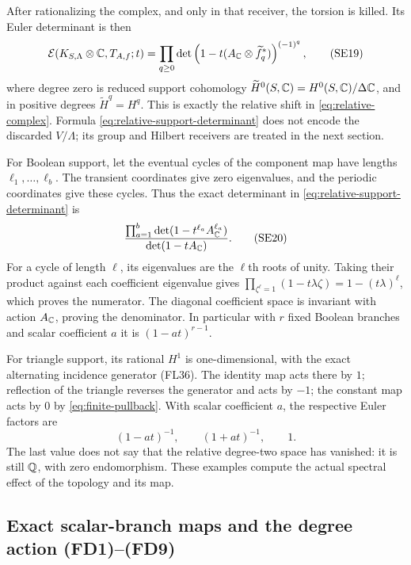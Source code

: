 After rationalizing the complex, and only in that receiver, the
torsion is killed. Its Euler determinant is then
\[
 \mathcal E(K_{S,\Lambda}\otimes\mathbb C,T_{A,f};t)
 =\prod_{q\ge0}
 \det\left(1-t(A_\mathbb C\otimes\widetilde f_q^*)\right)^{(-1)^q},
 \tag{SE19}\label{eq:relative-support-determinant}
\]
where degree zero is reduced support cohomology
$\widetilde H^0(S,\mathbb C)=H^0(S,\mathbb C)/\Delta\mathbb C$, and in positive degrees
$\widetilde H^q=H^q$. This is exactly the relative shift in
\eqref{eq:relative-complex}. Formula \eqref{eq:relative-support-determinant}
does not encode the discarded $V/\Lambda$; its group and Hilbert
receivers are treated in the next section.

For Boolean support, let the eventual cycles of the component map
have lengths $\ell_1,\ldots,\ell_b$. The transient coordinates give
zero eigenvalues, and the periodic coordinates give these cycles.
Thus the exact determinant in \eqref{eq:relative-support-determinant}
is
\[
 \frac{\prod_{a=1}^b\det(1-t^{\ell_a}A_\mathbb C^{\ell_a})}
      {\det(1-tA_\mathbb C)}.
 \tag{SE20}\label{eq:boolean-determinant}
\]
For a cycle of length $\ell$, its eigenvalues are the $\ell$th roots
of unity. Taking their product against each coefficient eigenvalue
gives $\prod_{\zeta^\ell=1}(1-t\lambda\zeta)=1-(t\lambda)^\ell$,
which proves the numerator. The diagonal coefficient space is
invariant with action $A_\mathbb C$, proving the denominator. In particular
with $r$ fixed Boolean branches and scalar coefficient $a$ it is
$(1-at)^{r-1}$.

For triangle support, its rational $H^1$ is one-dimensional, with
the exact alternating incidence generator (FL36). The identity map
acts there by $1$; reflection of the triangle reverses the generator
and acts by $-1$; the constant map acts by $0$ by
\eqref{eq:finite-pullback}. With scalar coefficient $a$, the respective
Euler factors are
\[
 (1-at)^{-1},\qquad(1+at)^{-1},\qquad1.
 \tag{SE21}\label{eq:triangle-determinants}
\]
The last value does not say that the relative degree-two space has
vanished: it is still $\mathbb Q$, with zero endomorphism. These examples
compute the actual spectral effect of the topology and its map.

\subsection{Exact scalar-branch maps and the degree action (FD1)--(FD9)}

